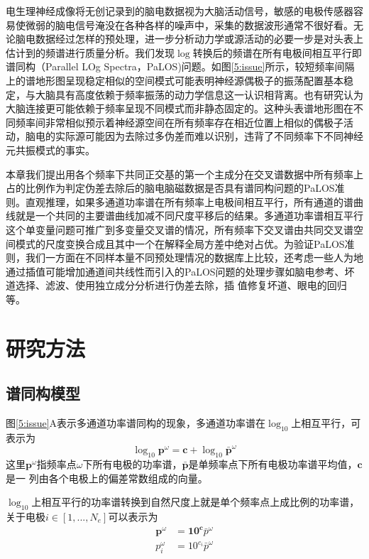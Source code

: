 电生理神经成像将无创记录到的脑电数据视为大脑活动信号，敏感的电极传感器容易使微弱的脑电信号淹没在各种各样的噪声中，采集的数据波形通常不很好看。无论脑电数据经过怎样的预处理，进一步分析动力学或源活动的必要一步是对头表上估计到的频谱进行质量分析。我们发现$\log$转换后的频谱在所有电极间相互平行即谱同构（Parallel LOg Spectra，PaLOS)问题。如图\ref{5:issue}所示，较短频率间隔上的谱地形图呈现稳定相似的空间模式可能表明神经源偶极子的振荡配置基本稳定，与大脑具有高度依赖于频率振荡的动力学信息这一认识相背离。也有研究认为大脑连接更可能依赖于频率呈现不同模式而非静态固定的。这种头表谱地形图在不同频率间非常相似预示着神经源空间在所有频率存在相近位置上相似的偶极子活动，脑电的实际源可能因为去除过多伪差而难以识别，违背了不同频率下不同神经元共振模式的事实。

本章我们提出用各个频率下共同正交基的第一个主成分在交叉谱数据中所有频率上占的比例作为判定伪差去除后的脑电脑磁数据是否具有谱同构问题的PaLOS准则。直观推理，如果多通道功率谱在所有频率上电极间相互平行，所有通道的谱曲线就是一个共同的主要谱曲线加减不同尺度平移后的结果。多通道功率谱相互平行这个单变量问题可推广到多变量交叉谱的情况，所有频率下交叉谱由共同交叉谱空间模式的尺度变换合成且其中一个在解释全局方差中绝对占优。为验证PaLOS准则，我们一方面在不同样本量不同预处理情况的数据库上比较，还考虑一些人为地通过插值可能增加通道间共线性而引入的PaLOS问题的处理步骤如脑电参考、坏道选择、滤波、使用独立成分分析进行伪差去除，插
值修复坏道、眼电的回归等。 

\section{研究方法}
\subsection{谱同构模型}
图\ref{5:issue}A表示多通道功率谱同构的现象，多通道功率谱在$\log_{10}$上相互平行，可表示为
\begin{equation}\label{eq5.1}
\log_{10}\mathbf{p}^\omega=\mathbf{c}+\log_{10}\bar{\mathbf{p}}^\omega
\end{equation}
这里$\mathbf{p}^\omega$指频率点$\omega$下所有电极的功率谱，$\bar{\mathbf{p}}$是单频率点下所有电极功率谱平均值，$\mathbf{c}$是一
列由各个电极上的偏差常数组成的向量。

$\log_{10}$上相互平行的功率谱转换到自然尺度上就是单个频率点上成比例的功率谱，关于电极$i\in[1,...,N_e]$可以表示为
\begin{equation}\label{eq5.2}
\begin{aligned}
\mathbf{p}^\omega& =\mathbf{10^c}\bar{p}^\omega\\
p_i^\omega& =10^{c_i}\bar{p}^\omega
\end{aligned}
\end{equation}

